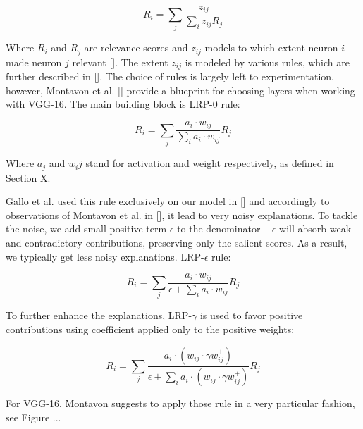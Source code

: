 \begin{equation}
    R_i = \sum_j \frac{z_{ij}}{\sum_i z_{ij} R_j}
\end{equation}

Where $R_i$ and $R_j$ are relevance scores and $z_{ij}$ models to which extent neuron $i$ made neuron $j$ relevant []. The extent $z_{ij}$ is modeled by various rules, which are further described in []. The choice of rules is largely left to experimentation, however, Montavon et al. [] provide a blueprint for choosing layers when working with VGG-16. The main building block is LRP-$0$ rule:

\begin{equation}
    R_i = \sum_j \frac{a_i \cdot w_{ij}}{\sum_i a_i \cdot w_{ij}} R_j
\end{equation}

Where $a_j$ and $w_ij$ stand for activation and weight respectively, as defined in Section X.

Gallo et al. used this rule exclusively on our model in [] and accordingly to observations of Montavon et al. in [], it lead to very noisy explanations. To tackle the noise, we add small positive term $\epsilon$ to the denominator -- $\epsilon$ will absorb weak and contradictory contributions, preserving only the salient scores. As a result, we typically get less noisy explanations. LRP-$\epsilon$ rule:

\begin{equation}
    R_i = \sum_j \frac{a_i \cdot w_{ij}}{\epsilon + \sum_i a_i \cdot w_{ij}} R_j
\end{equation}

To further enhance the explanations, LRP-$\gamma$ is used to favor positive contributions using coefficient applied only to the positive weights:

\begin{equation}
    R_i = \sum_j \frac{a_i \cdot (w_{ij} \cdot \gamma w_{ij}^+)}{\epsilon + \sum_i a_i \cdot (w_{ij} \cdot \gamma w_{ij}^+)} R_j
\end{equation}

For VGG-16, Montavon suggests to apply those rule in a very particular fashion, see Figure ...

